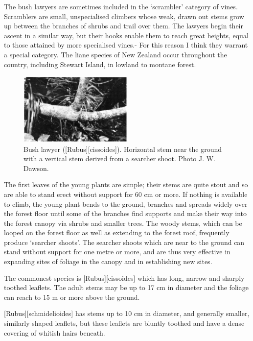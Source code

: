 The bush lawyers are sometimes included in the `scrambler' category of vines.
Scramblers are small, unspecialised climbers whose weak, drawn out stems grow up between the branches of shrubs and trail over them.
The lawyers begin their ascent in a similar way, but their hooks enable them to reach great heights, equal to those attained by more specialised vines.- For this reason I think they warrant a special category.
The liane species of New Zealand  occur throughout the country, including Stewart Island, in lowland to montane forest.

\begin{figure}
	\includegraphics[width=0.5\textwidth]{graphics/figure36bushlawyer.jpg}
	\centering
	\caption[Bush lawyer]{Bush lawyer ([Rubus][cissoides]).
	Horizontal stem near the ground with a vertical stem derived from a searcher shoot.
	Photo  J. W. Dawson.}%
	\label{fig:36bushlawyer}
\end{figure}

The first leaves of the young plants are simple; their stems are quite stout and so are able to stand erect without support for 60 cm or more.
If nothing is available to climb, the young plant bends to the ground, branches and spreads widely over the forest floor until some of the branches find supports and make their way into the forest canopy via shrubs and smaller trees.
The woody stems, which can be looped on the forest floor as well as extending to the forest roof, frequently produce `searcher shoots'.
The searcher shoots which are near to the ground can stand without support for one metre or more, and are thus very effective in expanding sites of  foliage in the canopy and in establishing new sites.

The commonest species is [Rubus][cissoides] which has long, narrow and sharply toothed leaflets.
The adult stems may be up to 17 cm in diameter and the foliage can reach to 15 m or more above the ground.

[Rubus][schmidelioides] has stems up to 10 cm in diameter, and generally smaller, similarly shaped leaflets, but these leaflets are bluntly toothed and have a dense covering of whitish hairs beneath.

